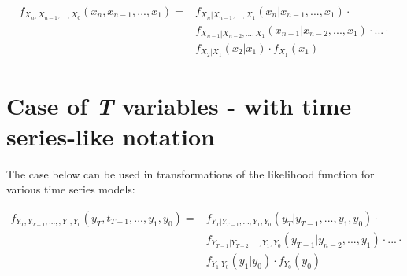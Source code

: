 \documentclass[12pt]{article}
\begin{document}
\begin{equation*}
\begin{split}
f_{X_n, X_{n-1}, ..., X_0}(x_n, x_{n-1}, ..., x_1) = 
& f_{X_n | X_{n-1}, ..., X_1}(x_n | x_{n-1}, ..., x_1) \cdot \\
& f_{X_{n-1} | X_{n-2}, ..., X_1}(x_{n-1} | x_{n-2}, ..., x_1) \cdot ... \cdot \\
& f_{X_2 | X_1} (x_2 | x_1) \cdot f_{X_1}(x_1)
\end{split}
\end{equation*}

\section{Case of \textit{T} variables - with time series-like notation}
The case below can be used in transformations of the likelihood function for various
time series models:

\begin{equation*}
\begin{split}
f_{Y_T, Y_{T-1}, ..., ,Y_1, Y_0}(y_T, t_{T-1}, ..., y_1, y_0) = 
& f_{Y_T | Y_{T-1}, ..., Y_1, Y_0}(y_T | y_{T-1}, ..., y_1, y_0) \cdot \\
& f_{Y_{T-1} | Y_{T-2}, ..., Y_1, Y_0}(y_{T-1} | y_{n-2}, ..., y_1) \cdot ... \cdot \\
& f_{Y_1 | Y_0} (y_1 | y_0) \cdot f_{Y_0}(y_0)
\end{split}
\end{equation*}
\end{document}
